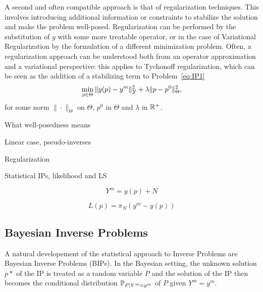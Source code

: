 A second and often compatible approach is that of regularization techniques. This involves introducing additional information or constraints to stabilize the solution and make the problem well-posed. Regularization can be performed by the substitution of $y$ with some more treatable operator, or in the case of Variational Regularization by the formulation of a different minimization problem. Often, a regularization approach can be understood both from an operator approximation and a variational perspective: this applies to Tychonoff regularization, which can be seen as the addition of a stabilizing term to Problem~\ref{eq:IP1}
\begin{equation}\label{eq:Tycho}
    \min_{p\in \Theta} \| y(p) - y^m \|_\mathcal Y^2 + \lambda\| p - p^0 \|_\Theta^2,
\end{equation}
for some norm $\|\cdot\|_\Theta$ on $\Theta$, $p^0$ in $\Theta$ and $\lambda $ in $ \mathbb{R}^+$.

What well-posedness means

Linear case, pseudo-inverses

Regularization

Statistical IPs, likelihood and LS 

\begin{equation}\label{eq:par-to-obs}
    Y^m = y(p) + N
\end{equation}

\begin{equation}\label{eq:likelihood}
    L(p) = \pi_N(y^m - y(p))
\end{equation}

\subsection{Bayesian Inverse Problems}\label{sec:BIP}

A natural developement of the statistical approach to Inverse Problems are Bayesian Inverse Problems (BIPs). 
In the Bayesian setting, the unknown solution $p*$ of the IP is treated as a random variable $P$ and the solution of the IP then becomes the conditional distribution $\mathbb P_{P \mid Y^m=y^m} $ of $P$ given $Y^m=y^m$.

